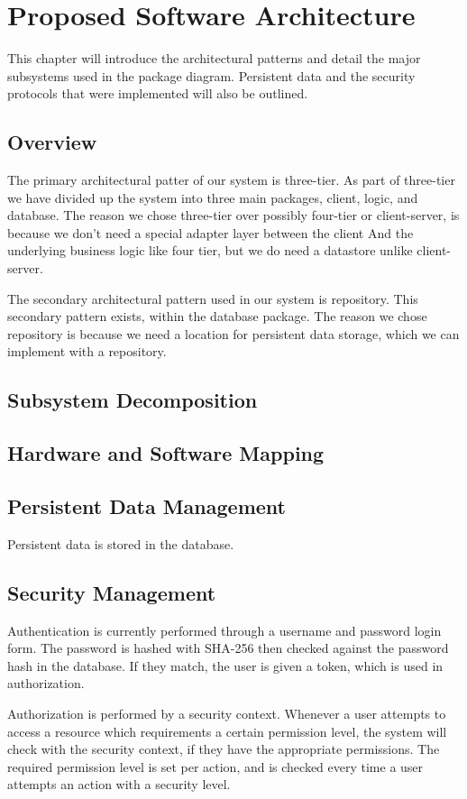 \documentclass{report}
\begin{document}
\chapter{Proposed Software Architecture}
	This chapter will introduce the architectural patterns and detail the major subsystems used in the package diagram.
	Persistent data and the security protocols that were implemented will also be outlined.
\section{Overview}
	The primary architectural patter of our system is three-tier.
	As part of three-tier we have divided up the system into three main packages,
	client, logic, and database.
	The reason we chose three-tier over possibly four-tier or client-server,
	is because we don't need a special adapter layer between the client And
	the underlying business logic like four tier, but we do need a datastore
	unlike client-server.

	The secondary architectural pattern used in our system is repository.
	This secondary pattern exists, within the database package.
	The reason we chose repository is because we need a location for
	persistent data storage, which we can implement with a repository.

\section{Subsystem Decomposition}
\section{Hardware and Software Mapping}
\section{Persistent Data Management}
	Persistent data is stored in the database.
	

\section{Security Management}
	Authentication is currently performed through a username and password login form.
	The password is hashed with SHA-256 then checked against the password hash in the database.
	If they match, the user is given a token, which is used in authorization.

	Authorization is performed by a security context.
	Whenever a user attempts to access a resource which requirements a certain permission level,
	the system will check with the security context, if they have the appropriate permissions.
	The required permission level is set per action, and is checked every time
	a user attempts an action with a security level.
\end{document}
